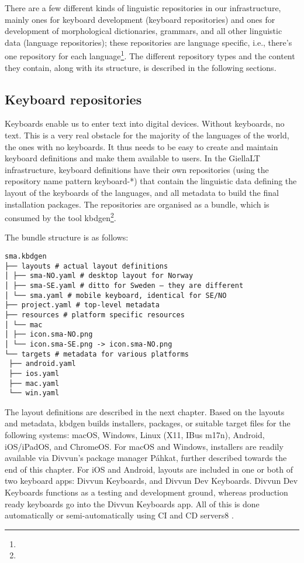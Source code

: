 \documentclass[free]{flammie}
\begin{document}
There are a few different kinds of linguistic repositories in our
infrastructure, mainly ones for keyboard development (keyboard repositories) and
ones for development of morphological dictionaries, grammars, and all other
linguistic data (language repositories); these repositories are language
specific, i.e., there’s one repository for each language\footnote{}. The
different repository types and the content they contain, along with its
structure, is described in the following sections.

\subsection{Keyboard repositories}

Keyboards enable us to enter text into digital devices. Without keyboards, no
text. This is a very real obstacle for the majority of the languages of the
world, the ones with no keyboards. It thus needs to be easy to create and
maintain keyboard definitions and make them available to users.  In the GiellaLT
infrastructure, keyboard definitions have their own repositories (using the
repository name pattern keyboard-*) that contain the linguistic data defining
the layout of the keyboards of the languages, and all metadata to build the
final installation packages. The repositories are organised as a bundle, which
is consumed by the tool kbdgen\footnote{}.

The bundle structure is as follows:
\begin{verbatim}
sma.kbdgen
├── layouts # actual layout definitions
│ ├── sma-NO.yaml # desktop layout for Norway
│ ├── sma-SE.yaml # ditto for Sweden – they are different
│ └── sma.yaml # mobile keyboard, identical for SE/NO
├── project.yaml # top-level metadata
├── resources # platform specific resources
│ └── mac
│ ├── icon.sma-NO.png
│ └── icon.sma-SE.png -> icon.sma-NO.png
└── targets # metadata for various platforms
 ├── android.yaml
 ├── ios.yaml
 ├── mac.yaml
 └── win.yaml
\end{verbatim}

The layout definitions are described in the next chapter.
Based on the layouts and metadata, kbdgen builds installers, packages, or suitable target files for the following systems: macOS, Windows, Linux (X11, IBus m17n), Android,
iOS/iPadOS, and ChromeOS. For macOS and Windows, installers are readily available via
Divvun’s package manager Páhkat, further described towards the end of this chapter. For
iOS and Android, layouts are included in one or both of two keyboard apps: Divvun Keyboards, and Divvun Dev Keyboards. Divvun Dev Keyboards functions as a testing and
development ground, whereas production ready keyboards go into the Divvun Keyboards
app. All of this is done automatically or semi-automatically using CI and CD servers8
.
\end{document}
